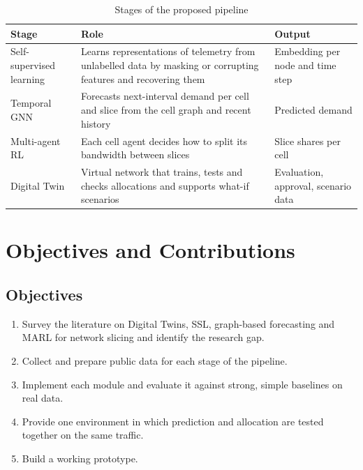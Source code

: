 \begin{table}[h]
	\centering
	\caption{Stages of the proposed pipeline}
	\label{tab:pipeline}
	\begin{tabular}{|p{2.8cm}|p{6.5cm}|p{4.2cm}|}
		\hline
		\textbf{Stage} & \textbf{Role} & \textbf{Output} \\ \hline
		Self-supervised learning & Learns representations of telemetry from unlabelled data by masking or corrupting features and recovering them & Embedding per node and time step \\ \hline
		Temporal GNN & Forecasts next-interval demand per cell and slice from the cell graph and recent history & Predicted demand \\ \hline
		Multi-agent RL & Each cell agent decides how to split its bandwidth between slices & Slice shares per cell \\ \hline
		Digital Twin & Virtual network that trains, tests and checks allocations and supports what-if scenarios & Evaluation, approval, scenario data \\ \hline
	\end{tabular}
\end{table}

\section{Objectives and Contributions}
\subsection{Objectives}
\begin{enumerate}
	\item Survey the literature on Digital Twins, SSL, graph-based forecasting and MARL for network slicing and identify the research gap.
	\item Collect and prepare public data for each stage of the pipeline.
	\item Implement each module and evaluate it against strong, simple baselines on real data.
	\item Provide one environment in which prediction and allocation are tested together on the same traffic.
	\item Build a working prototype.
\end{enumerate}

